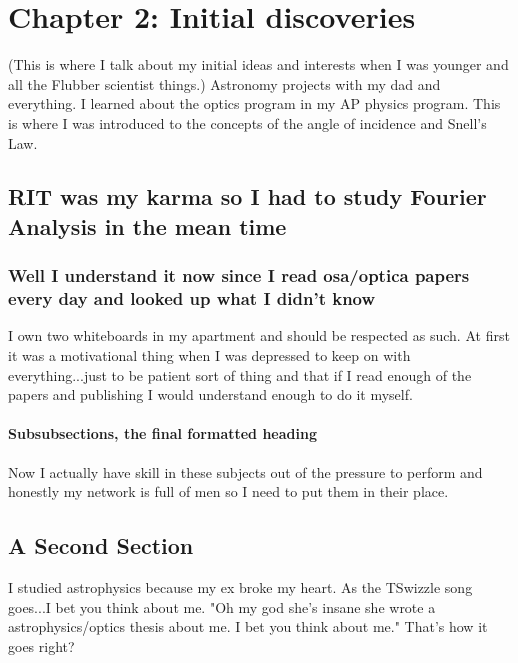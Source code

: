 \chapter{Chapter 2: Initial discoveries}

(This is where I talk about my initial ideas and interests when I was younger and all the Flubber scientist things.) Astronomy projects with my dad and everything. 
I learned about the optics program in my AP physics program. This is where I was introduced to the concepts of the angle of incidence and Snell's Law. 

\section[Shorter Title]{RIT was my karma so I had to study Fourier Analysis in the mean time}



\subsection{Well I understand it now since I read osa/optica papers every day and looked up what I didn't know}

I own two whiteboards in my apartment and should be respected as such. At first it was a motivational thing when I was depressed to keep on with everything...just to be patient sort of thing and that if I read enough of the papers and publishing I would understand enough to do it myself. 

\subsubsection{Subsubsections, the final formatted heading}

Now I actually have skill in these subjects out of the pressure to perform and honestly my network is full of men so I need to put them in their place. 

\section{A Second Section}

I studied astrophysics because my ex broke my heart. As the TSwizzle song goes...I bet you think about me. "Oh my god she's insane she wrote a astrophysics/optics thesis about me. I bet you think about me." That's how it goes right?